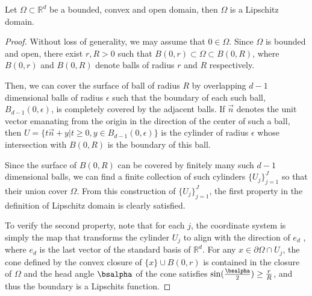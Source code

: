 \begin{lemma}\label{lemma:convexLip}
Let $\Omega\subset\mathbb{R}^d$ be a bounded, convex and open domain, then $\Omega$ is a Lipschitz domain.
\end{lemma}
\begin{proof}
Without loss of generality, we may assume that $0\in\Omega$. Since $\Omega$ is bounded and open, there exist $r, R > 0$ such that $B(0,r)\subset \Omega\subset B(0,R)$, where $B(0,r)$ and $B(0,R)$ denote balls of radius $r$ and $R$ respectively. 

Then, we can cover the surface of ball of radius $R$ by overlapping $d-1$ dimensional balls of radius $\epsilon$ such that the boundary of each such ball, $B_{d-1}(0, \epsilon)$, is completely covered by the adjacent balls. If $\vec{n}$ denotes the unit vector emanating from the origin in the direction of the center of such a ball, then $U = \{t\vec{n} + y|t\geq 0, y\in B_{d-1}(0, \epsilon)\}$ is the cylinder of radius $\epsilon$ whose intersection with $B(0,R)$ is the boundary of this ball.

Since the surface of $B(0, R)$ can be covered by finitely many such $d-1$ dimensional balls, we can find a finite collection of such cylinders $\{U_j\}_{j=1}^J$ so that their union cover $\Omega$. From this construction of $\{U_j\}_{j=1}^J$, the first property in the definition of Lipschitz domain is clearly satisfied. 

To verify the second property, note that for each
$j$, the coordinate system is simply the map that transforms the cylinder $U_j$ to align with the direction of $e_d$ , where $e_d$ is the last vector of the
standard basis of $\mathbb{R}^d$. For any $x \in \partial\Omega\cap U_j$, the cone defined by the convex closure of $\{x\} \cup B(0,r)$ is contained in the closure of $\Omega$ and the head angle $\bsalpha$ of the cone satisfies $\sin(\frac{\bsalpha}{2}) \geq \frac{r}{R}$, and thus the boundary is a Lipschits function. 



\end{proof}



